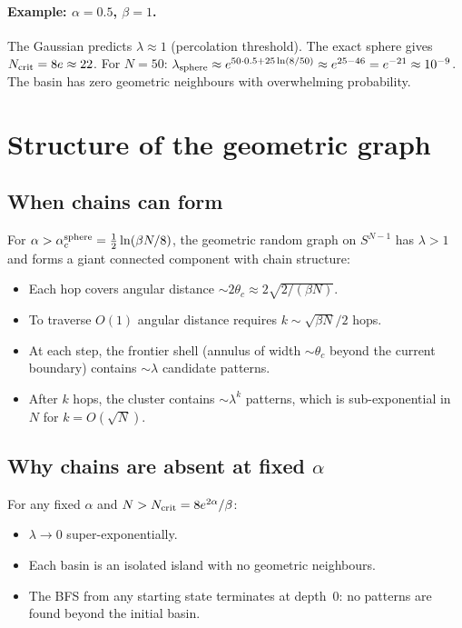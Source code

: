 \documentclass[11pt]{article}
\begin{document}
\paragraph{Example: $\alpha = 0.5$, $\beta = 1$.}
The Gaussian predicts $\lambda \approx 1$ (percolation threshold).
The exact sphere gives $N_{\rm crit} = 8e \approx 22$.
For $N = 50$: $\lambda_{\rm sphere} \approx e^{50 \cdot 0.5
+ 25\ln(8/50)} \approx e^{25 - 46} = e^{-21} \approx 10^{-9}$.
The basin has zero geometric neighbours with overwhelming probability.


\section{Structure of the geometric graph}
\label{sec:graph}

\subsection{When chains can form}

For $\alpha > \alpha_c^{\rm sphere}
= \tfrac{1}{2}\ln(\beta N/8)$, the geometric random
graph on $S^{N-1}$ has $\lambda > 1$ and forms a
giant connected component with chain structure:
\begin{itemize}
  \item Each hop covers angular distance
    $\sim 2\theta_c \approx 2\sqrt{2/(\beta N)}$.
  \item To traverse $O(1)$ angular distance requires
    $k \sim \sqrt{\beta N}/2$ hops.
  \item At each step, the frontier shell (annulus of width
    $\sim \theta_c$ beyond the current boundary) contains
    $\sim \lambda$ candidate patterns.
  \item After $k$ hops, the cluster contains $\sim \lambda^k$
    patterns, which is sub-exponential in~$N$ for
    $k = O(\sqrt{N})$.
\end{itemize}

\subsection{Why chains are absent at fixed $\alpha$}

For any fixed $\alpha$ and $N > N_{\rm crit}
= 8e^{2\alpha}/\beta$:
\begin{itemize}
  \item $\lambda \to 0$ super-exponentially.
  \item Each basin is an isolated island with no geometric
    neighbours.
  \item The BFS from any starting state terminates at depth~0:
    no patterns are found beyond the initial basin.
\end{itemize}
\end{document}
